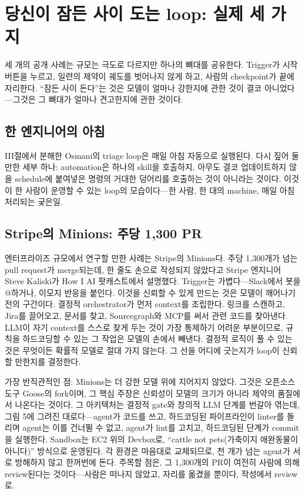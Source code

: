 \documentclass[conference]{IEEEtran}
\begin{document}
\section{당신이 잠든 사이 도는 loop: 실제 세 가지}
세 개의 공개 사례는 규모는 극도로 다르지만 하나의 뼈대를 공유한다. Trigger가 시작 버튼을 누르고, 일련의 제약이 궤도를 벗어나지 않게 하고, 사람의 checkpoint가 끝에 자리한다. ``잠든 사이 돈다''는 것은 모델이 얼마나 강한지에 관한 것이 결코 아니었다---그것은 그 뼈대가 얼마나 견고한지에 관한 것이다.

\subsection{한 엔지니어의 아침}
III절에서 분해한 Osmani의 triage loop은 매일 아침 자동으로 실행된다. 다시 짚어 둘 만한 세부 하나: automation은 하나의 skill을 호출하지, 아무도 결코 업데이트하지 않을 schedule에 붙여넣은 명령의 거대한 덩어리를 호출하는 것이 아니라는 것이다. 이것이 한 사람이 운영할 수 있는 loop의 모습이다---한 사람, 한 대의 machine, 매일 아침 처리되는 궂은일.

\subsection{Stripe의 Minions: 주당 1{,}300 PR}
엔터프라이즈 규모에서 연구할 만한 사례는 Stripe의 Minions다. 주당 1{,}300개가 넘는 pull request가 merge되는데, 한 줄도 손으로 작성되지 않았다고 Stripe 엔지니어 Steve Kaliski가 How I AI 팟캐스트에서 설명했다. Trigger는 가볍다---Slack에서 봇을 @하거나, 이모지 반응을 붙인다. 이것을 신뢰할 수 있게 만드는 것은 모델이 깨어나기 전의 구간이다. 결정적 orchestrator가 먼저 context를 조립한다. 링크를 스캔하고, Jira를 끌어오고, 문서를 찾고, Sourcegraph와 MCP를 써서 관련 코드를 찾아낸다. LLM이 자기 context를 스스로 찾게 두는 것이 가장 통제하기 어려운 부분이므로, 규칙을 하드코딩할 수 있는 그 작업은 모델의 손에서 빼낸다. 결정적 로직이 풀 수 있는 것은 무엇이든 확률적 모델로 절대 가지 않는다. 그 선을 어디에 긋는지가 loop이 신뢰할 만한지를 결정한다.

가장 반직관적인 점: Minions는 더 강한 모델 위에 지어지지 않았다. 그것은 오픈소스 도구 Goose의 fork이며, 그 핵심 주장은 신뢰성이 모델의 크기가 아니라 제약의 품질에서 나온다는 것이다. 그 아키텍처는 결정적 gate와 창의적 LLM 단계를 번갈아 엮는데, 그림 5에 그려진 대로다---agent가 코드를 쓰고, 하드코딩된 파이프라인이 linter를 돌리며 agent는 이를 건너뛸 수 없고, agent가 lint를 고치고, 하드코딩된 단계가 commit을 실행한다. Sandbox는 EC2 위의 Devbox로, ``cattle not pets(가축이지 애완동물이 아니다)'' 방식으로 운영된다. 각 환경은 마음대로 교체되므로, 천 개가 넘는 agent가 서로 방해하지 않고 한꺼번에 돈다. 주목할 점은, 그 1{,}300개의 PR이 여전히 사람에 의해 review된다는 것이다---사람은 떠나지 않았고, 자리를 옮겼을 뿐이다, 작성에서 review로.
\end{document}
